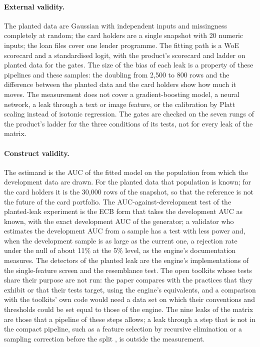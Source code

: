 \paragraph{External validity.} The planted data are Gaussian with independent inputs and missingness completely at random; the card holders are a single snapshot with 20 numeric inputs; the loan files cover one lender programme. The fitting path is a WoE scorecard and a standardised logit, with the product's scorecard and ladder on planted data for the gates. The size of the bias of each leak is a property of these pipelines and these samples: the doubling from 2,500 to 800 rows and the difference between the planted data and the card holders show how much it moves. The measurement does not cover a gradient-boosting model, a neural network, a leak through a text or image feature, or the calibration by Platt scaling instead of isotonic regression. The gates are checked on the seven rungs of the product's ladder for the three conditions of its tests, not for every leak of the matrix.

\paragraph{Construct validity.} The estimand is the AUC of the fitted model on the population from which the development data are drawn. For the planted data that population is known; for the card holders it is the 30,000 rows of the snapshot, so that the reference is not the future of the card portfolio. The AUC-against-development test of the planted-leak experiment is the ECB form that takes the development AUC as known, with the exact development AUC of the generator; a validator who estimates the development AUC from a sample has a test with less power and, when the development sample is as large as the current one, a rejection rate under the null of about 11\% at the 5\% level, as the engine's documentation measures. The detectors of the planted leak are the engine's implementations of the single-feature screen and the resemblance test. The open toolkits whose tests share their purpose are not run: the paper compares with the practices that they exhibit or that their tests target, using the engine's equivalents, and a comparison with the toolkits' own code would need a data set on which their conventions and thresholds could be set equal to those of the engine. The nine leaks of the matrix are those that a pipeline of these steps allows; a leak through a step that is not in the compact pipeline, such as a feature selection by recursive elimination or a sampling correction before the split \citep{goorbergh2022}, is outside the measurement.

